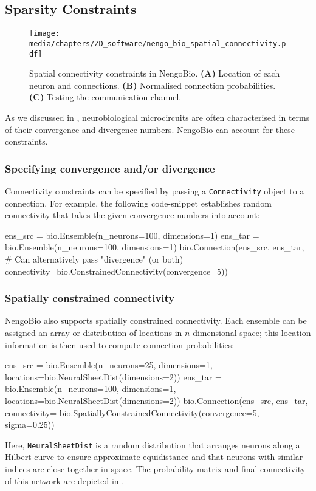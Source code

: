 \subsection{Sparsity Constraints}

\begin{figure}
	\centering
	\texttt{[image: media/chapters/ZD\_software/nengo\_bio\_spatial\_connectivity.pdf]}
	\caption[Spatial connectivity constraints in NengoBio]{
		Spatial connectivity constraints in NengoBio.
		\textbf{(A)} Location of each neuron and connections.
		\textbf{(B)} Normalised connection probabilities.
		\textbf{(C)} Testing the communication channel.
	}
	\label{fig:nengo_bio_spatial_connectivity}
\end{figure}

As we discussed in , neurobiological microcircuits are often characterised in terms of their convergence and divergence numbers.
NengoBio can account for these constraints.

\subsubsection{Specifying convergence and/or divergence}
Connectivity constraints can be specified by passing a \texttt{Connectivity} object to a connection.
For example, the following code-snippet establishes random connectivity that takes the given convergence numbers into account:
\begin{pythoncode}
ens_src = bio.Ensemble(n_neurons=100, dimensions=1)
ens_tar = bio.Ensemble(n_neurons=100, dimensions=1)
bio.Connection(ens_src, ens_tar, # Can alternatively pass "divergence" (or both)
               connectivity=bio.ConstrainedConnectivity(convergence=5))
\end{pythoncode}

\subsubsection{Spatially constrained connectivity}
NengoBio also supports spatially constrained connectivity.
Each ensemble can be assigned an array or distribution of locations in $n$-dimensional space; this location information is then used to compute connection probabilities:
\begin{pythoncode}
ens_src = bio.Ensemble(n_neurons=25, dimensions=1,
                       locations=bio.NeuralSheetDist(dimensions=2))
ens_tar = bio.Ensemble(n_neurons=100, dimensions=1,
                       locations=bio.NeuralSheetDist(dimensions=2))
bio.Connection(ens_src, ens_tar, connectivity=
               bio.SpatiallyConstrainedConnectivity(convergence=5, sigma=0.25))
\end{pythoncode}
Here, \texttt{NeuralSheetDist} is a random distribution that arranges neurons along a Hilbert curve to ensure approximate equidistance and that neurons with similar indices are close together in space.
The probability matrix and final connectivity of this network are depicted in .


